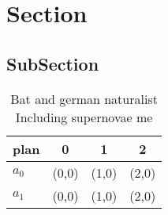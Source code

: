 \documentclass[a4paper]{article}
\begin{document}
\section{Section}

\subsection{SubSection}

\begin{table}
\begin{adjustbox}{width=0.6\columnwidth}
\begin{tabular}{|l|l|l|l|}
\hline
\textbf{plan} & \multicolumn{1}{c|}{\textbf{0}} & \multicolumn{1}{c|}{\textbf{1}} & \multicolumn{1}{c|}{\textbf{2}} \\ \hline
\textbf{$a_0$}  & (0,0) & (1,0) & (2,0) \\ \hline
\textbf{$a_1$}  & (0,0) & (1,0) & (2,0) \\ \hline
\end{tabular}
\end{adjustbox}
\caption{Bat and german naturalist Including supernovae me
}
\end{table}
\end{document}
